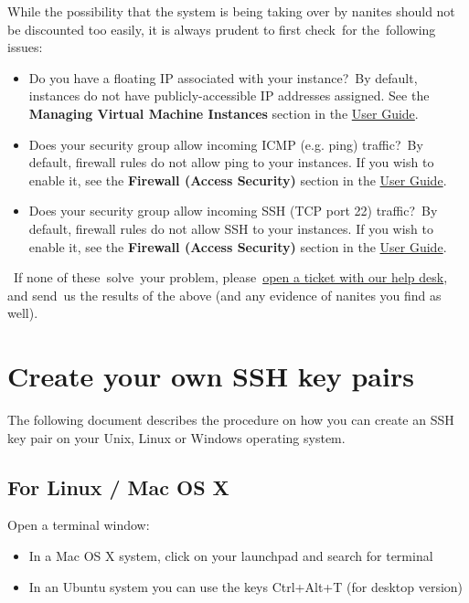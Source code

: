 While the possibility that the system is being taking over by nanites
should not be discounted too easily, it is always prudent to first
check~for the~following issues:

\begin{itemize}
\tightlist
\item
  Do you have a floating IP associated with your instance?~By default,
  instances do not have publicly-accessible IP addresses assigned. See
  the \textbf{Managing Virtual Machine Instances} section in the
  \href{https://www.chameleoncloud.org/docs/user-guides/openstack-kvm-user-guide/}{User
  Guide}.
\item
  Does your security group allow incoming ICMP (e.g. ping) traffic?~By
  default, firewall rules do not allow ping to your instances. If you
  wish to enable it, see the \textbf{Firewall (Access Security)} section
  in the
  \href{https://www.chameleoncloud.org/docs/user-guides/openstack-kvm-user-guide/}{User
  Guide}.
\item
  Does your security group allow incoming SSH (TCP port 22) traffic?~By
  default, firewall rules do not allow SSH to your instances. If you
  wish to enable it, see the \textbf{Firewall (Access Security)} section
  in the
  \href{https://www.chameleoncloud.org/docs/user-guides/openstack-kvm-user-guide/}{User
  Guide}.
\end{itemize}

~If none of these~solve~your problem,
please~\href{https://www.chameleoncloud.org/user/help/}{open a ticket
with our help desk}, and send~us the results of the above (and any
evidence of nanites you find as well).

\section{Create your own SSH key
pairs}\label{create-your-own-ssh-key-pairs}

The following document describes the procedure on how you can create an
SSH key pair on your Unix, Linux or Windows operating system.

\subsection{For Linux / Mac OS X}\label{for-linux-mac-os-x}

Open a terminal window:

\begin{itemize}
\tightlist
\item
  In a Mac OS X system, click on your launchpad and search for terminal
\item
  In an Ubuntu system you can use the keys Ctrl+Alt+T (for desktop
  version)
\end{itemize}

